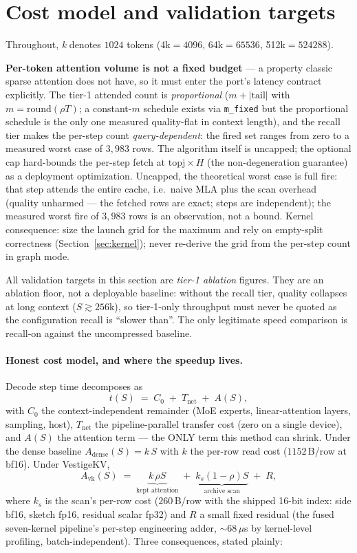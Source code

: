 \documentclass[11pt]{article}
\begin{document}
\section{Cost model and validation targets}\label{sec:cost}

Throughout, \emph{k} denotes $1024$ tokens (4k${=}4096$, 64k${=}65536$, 512k${=}524288$).

\textbf{Per-token attention volume is not a fixed budget} --- a property
classic sparse attention does not have, so it must enter the port's latency
contract explicitly. The tier-1 attended count is \emph{proportional}
($m + |\mathrm{tail}|$ with $m = \mathrm{round}(\rho T)$; a constant-$m$
schedule exists via \texttt{m\_fixed} but the proportional schedule is the
only one measured quality-flat in context length), and the recall tier makes
the per-step count \emph{query-dependent}: the fired set ranges from zero to
a measured worst case of $3{,}983$ rows. The algorithm itself is uncapped; the optional cap hard-bounds the
per-step fetch at $\mathrm{topj}\times H$ (the non-degeneration
guarantee) as a deployment optimization. Uncapped, the theoretical worst
case is full fire: that step attends the entire cache, i.e.\ naive MLA plus the scan
overhead (quality unharmed --- the fetched rows are exact; steps are
independent); the measured worst fire of $3{,}983$ rows is an observation,
not a bound. Kernel consequence: size the launch grid for
the maximum and rely on empty-split correctness
(Section~\ref{sec:kernel}); never re-derive the grid from the per-step
count in graph mode.

All validation targets in this section are \emph{tier-1 ablation}
figures. They are an ablation floor, not a deployable baseline: without the
recall tier, quality collapses at long context ($S \gtrsim 256$k), so
tier-1-only throughput must never be quoted as the configuration recall is
``slower than''. The only legitimate speed comparison is recall-on against
the uncompressed baseline.

\paragraph{Honest cost model, and where the speedup lives.} Decode step time
decomposes as
\[
t(S) \;=\; C_0 \;+\; T_{\mathrm{net}} \;+\; A(S),
\]
with $C_0$ the context-independent remainder (MoE experts, linear-attention
layers, sampling, host), $T_{\mathrm{net}}$ the pipeline-parallel transfer
cost (zero on a single device), and $A(S)$ the attention term --- the ONLY
term this method can shrink. Under the dense baseline
$A_{\mathrm{dense}}(S) = k\,S$ with $k$ the per-row read cost
($1152$\,B/row at bf16). Under VestigeKV,
\[
A_{\mathrm{vk}}(S) \;=\; \underbrace{k\,\rho S}_{\text{kept attention}}
\;+\; \underbrace{k_s (1-\rho) S}_{\text{archive scan}} \;+\; R,
\]
where $k_s$ is the scan's per-row cost ($260$\,B/row with the shipped
16-bit index: side bf16, sketch fp16, residual scalar fp32) and $R$ a
small fixed residual (the fused seven-kernel pipeline's per-step engineering
adder, ${\sim}68\,\mu$s by kernel-level profiling, batch-independent). Three consequences, stated
plainly:
\end{document}
